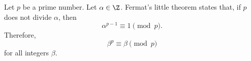 \documentclass [preview, border = 20pt] {standalone}
\begin{document}
\pagecolor{black}
\color{white}
Let $p$ be a prime number. Let $\alpha\in \Z$. Fermat's little theorem states that, if $p$ does not divide $\alpha$, then
\[
  \alpha^{p-1}\equiv 1\pmod p.
\]
Therefore,
\[
  \beta^p \equiv \beta\pmod p
\]
for all integers $\beta$.
\end{document}
